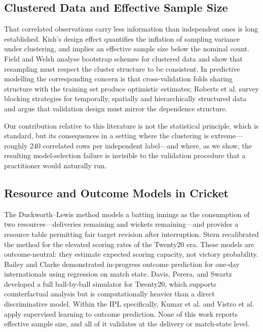 \documentclass[conference]{IEEEtran}
\begin{document}
\subsection{Clustered Data and Effective Sample Size}

That correlated observations carry less information than independent
ones is long established. Kish's design effect \cite{kish1965}
quantifies the inflation of sampling variance under clustering, and
implies an effective sample size below the nominal count. Field and
Welsh \cite{field2007} analyse bootstrap schemes for clustered data and
show that resampling must respect the cluster structure to be
consistent. In predictive modelling the corresponding concern is that
cross-validation folds sharing structure with the training set produce
optimistic estimates; Roberts et al. \cite{roberts2017} survey blocking
strategies for temporally, spatially and hierarchically structured data
and argue that validation design must mirror the dependence structure.

Our contribution relative to this literature is not the statistical
principle, which is standard, but its consequences in a setting where
the clustering is extreme---roughly 240 correlated rows per independent
label---and where, as we show, the resulting model-selection failure is
invisible to the validation procedure that a practitioner would
naturally run.

\subsection{Resource and Outcome Models in Cricket}

The Duckworth--Lewis method \cite{dl1998} models a batting innings as
the consumption of two resources---deliveries remaining and wickets
remaining---and provides a resource table permitting fair target
revision after interruption. Stern \cite{stern2016} recalibrated the
method for the elevated scoring rates of the Twenty20 era. These models
are outcome-neutral: they estimate expected scoring capacity, not
victory probability. Bailey and Clarke \cite{bailey2006} demonstrated
in-progress outcome prediction for one-day internationals using
regression on match state. Davis, Perera, and Swartz \cite{davis2015}
developed a full ball-by-ball simulator for Twenty20, which supports
counterfactual analysis but is computationally heavier than a direct
discriminative model. Within the IPL specifically, Kumar et al.
\cite{kumar2018} and Vistro et al. \cite{vistro2019} apply supervised
learning to outcome prediction. None of this work reports effective
sample size, and all of it validates at the delivery or match-state
level.
\end{document}
